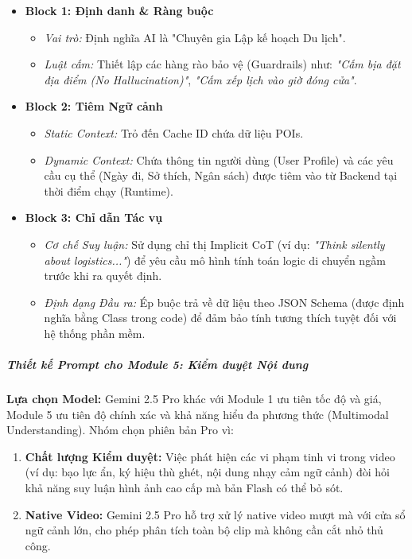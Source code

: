 \begin{itemize}
    \item \textbf{Block 1: Định danh \& Ràng buộc}
    \begin{itemize}
        \item \textit{Vai trò:} Định nghĩa AI là "Chuyên gia Lập kế hoạch Du lịch".
        \item \textit{Luật cấm:} Thiết lập các hàng rào bảo vệ (Guardrails) như: \textit{"Cấm bịa đặt địa điểm (No Hallucination)"}, \textit{"Cấm xếp lịch vào giờ đóng cửa"}.
    \end{itemize}
    
    \item \textbf{Block 2: Tiêm Ngữ cảnh}
    \begin{itemize}
        \item \textit{Static Context:} Trỏ đến Cache ID chứa dữ liệu POIs.
        \item \textit{Dynamic Context:} Chứa thông tin người dùng (User Profile) và các yêu cầu cụ thể (Ngày đi, Sở thích, Ngân sách) được tiêm vào từ Backend tại thời điểm chạy (Runtime).
    \end{itemize}
    
    \item \textbf{Block 3: Chỉ dẫn Tác vụ}
    \begin{itemize}
        \item \textit{Cơ chế Suy luận:} Sử dụng chỉ thị Implicit CoT (ví dụ: \textit{"Think silently about logistics..."}) để yêu cầu mô hình tính toán logic di chuyển ngầm trước khi ra quyết định.
        \item \textit{Định dạng Đầu ra:} Ép buộc trả về dữ liệu theo JSON Schema (được định nghĩa bằng Class trong code) để đảm bảo tính tương thích tuyệt đối với hệ thống phần mềm.
    \end{itemize}
\end{itemize}

\subparagraph{Thiết kế Prompt cho Module 5: Kiểm duyệt Nội dung}

\textbf{Lựa chọn Model:} Gemini 2.5 Pro khác với Module 1 ưu tiên tốc độ và giá, Module 5 ưu tiên độ chính xác và khả năng hiểu đa phương thức (Multimodal Understanding). Nhóm chọn phiên bản Pro vì:

\begin{enumerate}[label=\arabic*., leftmargin=*]
    \item \textbf{Chất lượng Kiểm duyệt:} Việc phát hiện các vi phạm tinh vi trong video (ví dụ: bạo lực ẩn, ký hiệu thù ghét, nội dung nhạy cảm ngữ cảnh) đòi hỏi khả năng suy luận hình ảnh cao cấp mà bản Flash có thể bỏ sót.
    
    \item \textbf{Native Video:} Gemini 2.5 Pro hỗ trợ xử lý native video mượt mà với cửa sổ ngữ cảnh lớn, cho phép phân tích toàn bộ clip mà không cần cắt nhỏ thủ công.
\end{enumerate}

